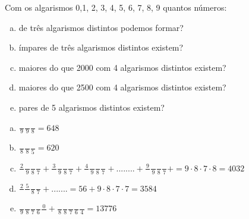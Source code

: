 \begin{ex}
 Com os algarismos 0,1, 2, 3, 4, 5, 6, 7,  8, 9 quantos números:
    \begin{enumerate}[(a)]
    \item de três algarismos distintos podemos formar?
    \item ímpares de três algarismos distintos existem?
    \item maiores do que 2000 com 4 algarismos distintos existem?
    \item maiores do que 2500 com 4 algarismos distintos existem?
    \item pares de 5 algarismos distintos existem?
    \end{enumerate}
      \begin{sol}
       \phantom{A}
         \begin{enumerate} [(a)]
             \item $\frac{\phantom{A}}{9}\frac{\phantom{A}}{9}\frac{\phantom{A}}{8}=648$
             \item $\frac{\phantom{A}}{8}\frac{\phantom{A}}{8}\frac{\phantom{A}}{5}=620$
             \item $\frac{2}{\phantom{A}}\frac{\phantom{A}}{9}\frac{\phantom{A}}{8}\frac{\phantom{A}}{7}+\frac{3}{\phantom{A}}\frac{\phantom{A}}{9}\frac{\phantom{A}}{8}\frac{\phantom{A}}{7}+\frac{4}{\phantom{A}}\frac{\phantom{A}}{9}\frac{\phantom{A}}{8}\frac{\phantom{A}}{7}+........+\frac{9}{\phantom{A}}\frac{\phantom{A}}{9}\frac{\phantom{A}}{8}\frac{\phantom{A}}{7}+= 9\cdot8\cdot7\cdot8=4032$
             \item $\frac{2}{\phantom{A}}\frac{5}{\phantom{A}}\frac{\phantom{A}}{8}\frac{\phantom{A}}{7}+.......=56+9\cdot8\cdot7\cdot7=3584$
             \item 
             $\frac{\phantom{A}}{9}\frac{\phantom{A}}{8}\frac{\phantom{A}}{7}\frac{\phantom{A}}{6}\frac{0}{\phantom{A}}+\frac{\phantom{A}}{8}\frac{\phantom{A}}{8}\frac{\phantom{A}}{7}\frac{\phantom{A}}{6}\frac{\phantom{A}}{4}=13776$
         \end{enumerate}
      \end{sol}
\end{ex}